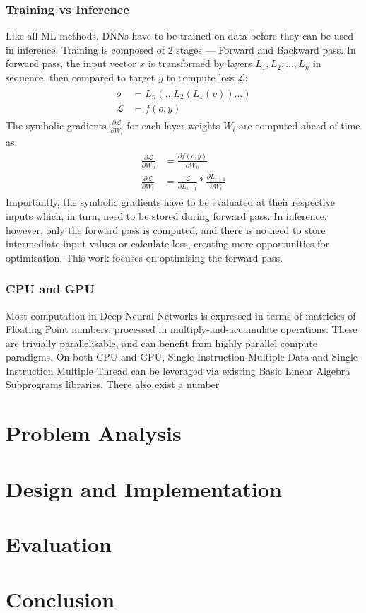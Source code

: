 \documentclass[12pt]{article}
\newcommand{\Loss}{\mathcal{L}}
\begin{document}
\subsubsection{Training vs Inference}
Like all ML methods, DNNs have to be trained on data before they can be used in inference. Training
is composed of 2 stages --- Forward and Backward pass.
In forward pass, the input vector $x$ is transformed by layers $L_1, L_2,..., L_n$  in sequence,
then compared to target $y$ to compute loss $\Loss$:
\begin{gather}
\begin{split}
    o &= L_n( ... L_2(L_1(v)) ... )\\
    \Loss &= f(o, y)
\end{split}
\end{gather}
The symbolic gradients $\frac{\partial \Loss}{\partial W_i}$ for each layer weights $W_i$
are computed ahead of time as:
\begin{gather}
\begin{split}
    \frac{\partial \Loss}{\partial W_n} &= \frac{\partial f(o, y)}{\partial W_n}\\
    \frac{\partial \Loss}{\partial W_i} &= \frac{\Loss}{\partial L_{i+1}} * \frac{\partial
    L_{i+1}}{\partial W_i}
\end{split}
\end{gather}
Importantly, the symbolic gradients have to be evaluated at their respective inputs which,
in turn, need to be stored during forward pass.
In inference, however, only the forward pass is computed, and there is no need to store
intermediate input values or calculate loss, creating more opportunities for optimisation.
This work focuses on optimising the forward pass.


\subsubsection{CPU and GPU}
Most computation in Deep Neural Networks is expressed in terms of matricies of Floating Point
numbers, processed in multiply-and-accumulate operations.
These are trivially parallelisable, and can benefit from highly parallel compute
paradigms\cite{sze2017efficient}.
On both CPU and GPU, Single Instruction Multiple Data and Single Instruction Multiple Thread
can be leveraged via existing Basic Linear Algebra Subprograms libraries.
There also exist a number

\section{Problem Analysis}

\section{Design and Implementation}

\section{Evaluation}

\section{Conclusion}


\end{document}
